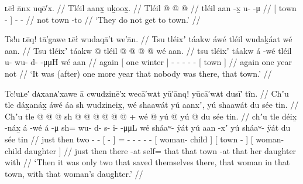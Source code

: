 \ex\label{ex:91-126-dont-get-to-town}%
%
\begingl
	\glpreamble	ʟēł ānx uqō′x. //
	\glpreamble	Tléil aanx̱ uḵoox̱. //
	\gla	Tléil {}  @ {} {}  @ {} @ {} //
	\glb	tléil {} aan -x̱ {} u-  -μ //
	\glc	{} {}[ town - {}] -  - //
	\gld	not {} town -to {}  {} {} //
	\glft	‘They do not get to town.’
		//
\endgl
\xe


\ex\label{ex:91-127-another-year-nobody}%
%
\begingl
	\glpreamble	Ts!u ʟēq! tā′gawe ʟēł wudaqā′t we′ān. //
	\glpreamble	Tsu tléixʼ táakw áwé tléil wudaḵáat wé aan. //
	\gla	Tsu {} tléixʼ táakw {}  @ {}
		tléil  @ {} @ {} @ {} @ {} 
		{} wé aan. {} //
	\glb	tsu {} tléixʼ táakw {} á -wé
		tléil u- wu- d-  -μμH
		{} wé aan {} //
	\glc	again {}[ one winter {}]  -
		 - - -  -
		{}[  town {}] //
	\gld	again {} one year {}  {}
		not  {} {} {} {} //
	\glft	‘It was (after) one more year that nobody was there, that town.’
		//
\endgl
\xe


\ex\label{ex:91-128-two-saved-self-woman-daughter}%
%
\begingl
	\glpreamble	Tc!uʟe′ dᴀxanᴀ′xawe ā cwudzinē′x wecā′wᴀt yū′ānq! yūcā′wᴀt dusī′ tîn. //
	\glpreamble	Chʼu tle dáx̱anáx̱ áwé áa sh wudzineix̱, wé shaawát yú aanxʼ, yú shaawát du sée tin. //
	\gla	Chʼu tle  @ {}  @ {}
		{}  @ {} {} sh @  @ {} @ {} @ {} @ {} @ {} +
		{} wé  @ {} {}
		{} yú  @ {} {}
		{} yú  @ {} du sée tin. {}  //
	\glb	chʼu tle déix̱ -náx̱ á -wé
		{} á -μ {} sh= wu- d- s- i-  -μμL
		{} wé sháaʷ- ÿát {}
		{} yú aan -xʼ {}
		{} yú sháaʷ- ÿát du sée tin {} //
	\glc	just then two -  -
		{}[  - {}]
		= - - - -  -
		{}[  woman- child {}]
		{}[  town - {}]
		{}[  woman- child  daughter  {}] //
	\gld	just then  {}  {}
		{} there -at {} self=  {} {} {} {} {}
		{} that  {} {}
		{} that town -at {}
		{} that  {} her daughter with {} //
	\glft	‘Then it was only two that saved themselves there, that woman in that town, with that woman’s daughter.’
		//
\endgl
\xe

